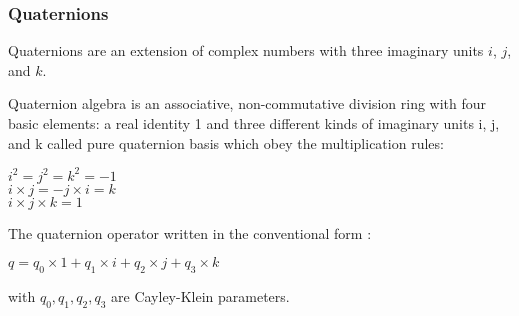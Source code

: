 \label{definition}
\begin{frame}\frametitle{Quaternions}
Quaternions are an extension of complex numbers with three imaginary units $i$, $j$, and $k$.

Quaternion algebra is an associative, non-commutative division ring with four basic elements: a real identity 1 and three different kinds of imaginary units i, j, and k called pure quaternion basis which obey the multiplication rules:
\begin{center}

$ i^2 =j^2 = k^2 = -1$\\ $i\times j = -j\times i = k$ \\ $i \times j \times k=1 $
\end{center}
The quaternion operator written in the conventional form :
\begin{center}
 $q=q_{0}\times 1+q_{1}\times i+q_{2}\times j+q_{3}\times k$

\end{center}

with $q_{0},q_{1},q_{2},q_{3}$ are Cayley-Klein parameters.

\end{frame}
